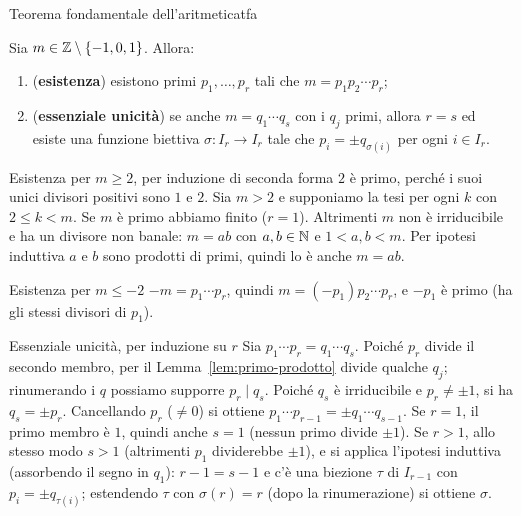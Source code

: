 \begin{concetto}
\begin{Teorema}{Teorema fondamentale dell'aritmetica}{tfa}
    \begin{prerequisiti}
    \end{prerequisiti}
    Sia $m \in \mathbb{Z} \setminus \{-1, 0, 1\}$. Allora:
    \begin{enumerate}
        \item (\textbf{esistenza}) esistono primi $p_1, \dots, p_r$ tali che $m = p_1 p_2 \cdots p_r$;
        \item (\textbf{essenziale unicità}) se anche $m = q_1 \cdots q_s$ con i $q_j$ primi, allora $r = s$ ed esiste una funzione biettiva
              $\sigma \colon I_r \to I_r$ tale che $p_i = \pm q_{\sigma(i)}$ per ogni $i \in I_r$.
    \end{enumerate}
\end{Teorema}
\begin{dimostrazione}
    \begin{caso}{Esistenza per $m \geq 2$, per induzione di seconda forma}
        $2$ è primo, perché i suoi unici divisori positivi sono $1$ e $2$. Sia $m > 2$ e supponiamo la tesi per ogni $k$ con $2 \leq k < m$.
        Se $m$ è primo abbiamo finito ($r = 1$). Altrimenti $m$ non è irriducibile e ha un divisore non banale: $m = ab$ con $a, b \in \mathbb{N}$ e
        $1 < a, b < m$. Per ipotesi induttiva $a$ e $b$ sono prodotti di primi, quindi lo è anche $m = ab$.
    \end{caso}
    \begin{caso}{Esistenza per $m \leq -2$}
        $-m = p_1 \cdots p_r$, quindi $m = (-p_1) p_2 \cdots p_r$, e $-p_1$ è primo (ha gli stessi divisori di $p_1$).
    \end{caso}
    \begin{caso}{Essenziale unicità, per induzione su $r$}
        Sia $p_1 \cdots p_r = q_1 \cdots q_s$. Poiché $p_r$ divide il secondo membro, per il Lemma~\ref{lem:primo-prodotto} divide qualche $q_j$;
        rinumerando i $q$ possiamo supporre $p_r \mid q_s$. Poiché $q_s$ è irriducibile e $p_r \neq \pm 1$, si ha $q_s = \pm p_r$. Cancellando
        $p_r$ ($\neq 0$) si ottiene $p_1 \cdots p_{r - 1} = \pm q_1 \cdots q_{s - 1}$. Se $r = 1$, il primo membro è $1$, quindi anche $s = 1$ (nessun primo
        divide $\pm 1$). Se $r > 1$, allo stesso modo $s > 1$ (altrimenti $p_1$ dividerebbe $\pm 1$), e si applica l'ipotesi induttiva (assorbendo il segno in $q_1$): $r - 1 = s - 1$ e c'è una biezione
        $\tau$ di $I_{r - 1}$ con $p_i = \pm q_{\tau(i)}$; estendendo $\tau$ con $\sigma(r) = r$ (dopo la rinumerazione) si ottiene $\sigma$.
    \end{caso}
\end{dimostrazione}
\end{concetto}

